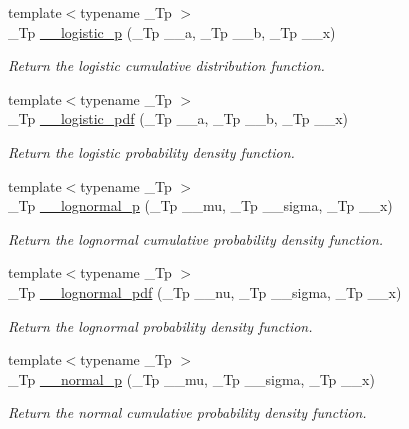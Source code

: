 \begin{DoxyCompactItemize}
{\footnotesize template$<$typename \+\_\+\+Tp $>$ }\\\+\_\+\+Tp \hyperlink{namespacestd_1_1____detail_a2ee185d74e39b87c74c3c428f8e73ee7}{\+\_\+\+\_\+logistic\+\_\+p} (\+\_\+\+Tp \+\_\+\+\_\+a, \+\_\+\+Tp \+\_\+\+\_\+b, \+\_\+\+Tp \+\_\+\+\_\+x)
\begin{DoxyCompactList}\small\item\em Return the logistic cumulative distribution function. \end{DoxyCompactList}\item 
{\footnotesize template$<$typename \+\_\+\+Tp $>$ }\\\+\_\+\+Tp \hyperlink{namespacestd_1_1____detail_a4c845b9f17fc3e35dccc0954d82d62f9}{\+\_\+\+\_\+logistic\+\_\+pdf} (\+\_\+\+Tp \+\_\+\+\_\+a, \+\_\+\+Tp \+\_\+\+\_\+b, \+\_\+\+Tp \+\_\+\+\_\+x)
\begin{DoxyCompactList}\small\item\em Return the logistic probability density function. \end{DoxyCompactList}\item 
{\footnotesize template$<$typename \+\_\+\+Tp $>$ }\\\+\_\+\+Tp \hyperlink{namespacestd_1_1____detail_a332aebbc96ef310620918cb6becb9760}{\+\_\+\+\_\+lognormal\+\_\+p} (\+\_\+\+Tp \+\_\+\+\_\+mu, \+\_\+\+Tp \+\_\+\+\_\+sigma, \+\_\+\+Tp \+\_\+\+\_\+x)
\begin{DoxyCompactList}\small\item\em Return the lognormal cumulative probability density function. \end{DoxyCompactList}\item 
{\footnotesize template$<$typename \+\_\+\+Tp $>$ }\\\+\_\+\+Tp \hyperlink{namespacestd_1_1____detail_a46c5dea7a38f38965bce5a84d389a02b}{\+\_\+\+\_\+lognormal\+\_\+pdf} (\+\_\+\+Tp \+\_\+\+\_\+nu, \+\_\+\+Tp \+\_\+\+\_\+sigma, \+\_\+\+Tp \+\_\+\+\_\+x)
\begin{DoxyCompactList}\small\item\em Return the lognormal probability density function. \end{DoxyCompactList}\item 
{\footnotesize template$<$typename \+\_\+\+Tp $>$ }\\\+\_\+\+Tp \hyperlink{namespacestd_1_1____detail_a4a088c2e6ddea7db99af9d114bf31b46}{\+\_\+\+\_\+normal\+\_\+p} (\+\_\+\+Tp \+\_\+\+\_\+mu, \+\_\+\+Tp \+\_\+\+\_\+sigma, \+\_\+\+Tp \+\_\+\+\_\+x)
\begin{DoxyCompactList}\small\item\em Return the normal cumulative probability density function. \end{DoxyCompactList}\item 

\end{DoxyCompactItemize}
